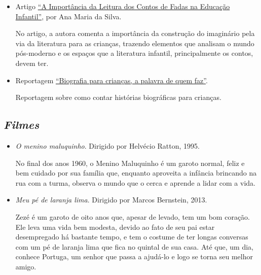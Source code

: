 \documentclass[11pt]{extarticle}
\begin{document}
\begin{itemize}
\item Artigo \href{https://siteantigo.portaleducacao.com.br/conteudo/artigos/educacao/a-importancia-da-leitura-dos-contos-de-fadas-na-educacao-infantil/30151}{``A Importância da Leitura dos Contos de Fadas na Educação Infantil''}, por Ana Maria da Silva.  


No artigo, a autora comenta a importância da construção do imaginário pela via da literatura para as crianças, trazendo elementos que analisam o mundo pós-moderno e os espaços que a literatura infantil, principalmente os contos, devem ter.

\item Reportagem \href{http://www.multirio.rj.gov.br/index.php/leia/reportagens-artigos/reportagens/3059-biografias-para-criancas-a-palavra-de-quem-faz}{``Biografia para crianças, a palavra de quem faz''}. 

Reportagem sobre como contar histórias biográficas para crianças.

\end{itemize}

\subsection{\textit{Filmes}}

\begin{itemize}
\item \textit{O menino maluquinho}. Dirigido por Helvécio Ratton, 1995.

No final dos anos 1960, o Menino Maluquinho é um garoto normal, feliz e bem cuidado por sua família que, enquanto aproveita a infância brincando na rua com a turma, observa o mundo que o cerca e aprende a lidar com a vida.

\item \textit{Meu pé de laranja lima}. Dirigido por Marcos Bernstein, 2013.

Zezé é um garoto de oito anos que, apesar de levado, tem um bom coração. Ele leva uma vida bem modesta, devido ao fato de seu pai estar desempregado há bastante tempo, e tem o costume de ter longas conversas com um pé de laranja lima que fica no quintal de sua casa. Até que, um dia, conhece Portuga, um senhor que passa a ajudá-lo e logo se torna seu melhor amigo.
\end{itemize}
\end{document}
